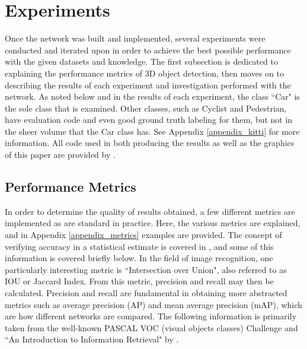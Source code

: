 \section{Experiments}
\label{sect_experiments}
Once the network was built and implemented, several experiments were conducted and iterated upon in order to achieve the best possible performance with the given datasets and knowledge. The first subsection is dedicated to explaining the performance metrics of 3D object detection, then moves on to describing the results of each experiment and investigation performed with the network. As noted below and in the results of each experiment, the class ``Car" is the sole class that is examined. Other classes, such as Cyclist and Pedestrian, have evaluation code and even good ground truth labeling for them, but not in the sheer volume that the Car class has. See Appendix \ref{appendix_kitti} for more information. All code used in both producing the results as well as the graphics of this paper are provided by \cite{gonzalez_smart3d_2019}. 

\subsection{Performance Metrics}
In order to determine the quality of results obtained, a few different metrics are implemented as are standard in practice. Here, the various metrics are explained, and in Appendix \ref{appendix_metrics} examples are provided. The concept of verifying accuracy in a statistical estimate is covered in \cite{manning_introduction_2008}, and some of this information is covered briefly below. In the field of image recognition, one particularly interesting metric is ``Intersection over Union", also referred to as IOU or Jaccard Index. From this metric, precision and recall may then be calculated. Precision and recall are fundamental in obtaining more abstracted metrics such as average precision (AP) and mean average precision (mAP), which are how different networks are compared. The following information is primarily taken from the well-known PASCAL VOC (visual objects classes) Challenge \cite{everingham_pascal_2010} and ``An Introduction to Information Retrieval" by \cite{manning_introduction_2008}.

